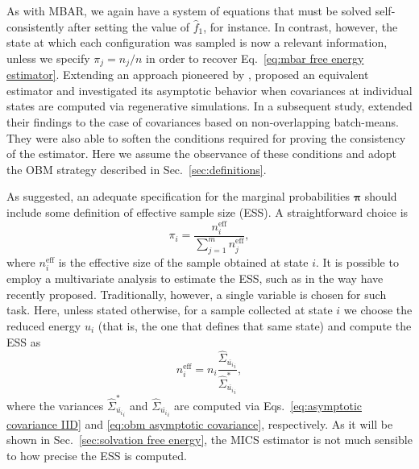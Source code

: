 \documentclass[journal=jctcce,manuscript=article,layout=twocolumn]{achemso}
\newcommand{\mt}[1]{\boldsymbol{\mathbf{#1}}}   %
\newcommand{\vt}[1]{\boldsymbol{\mathbf{#1}}}   %
\newcommand{\avg}[1]{\overline{#1}}             %
\begin{document}
As with MBAR, we again have a system of equations that must be solved self-consistently after setting the value of $\hat f_1$, for instance. In contrast, however, the state at which each configuration was sampled is now a relevant information, unless we specify $\pi_j = {n_j}/{n}$ in order to recover Eq.~\eqref{eq:mbar free energy estimator}. Extending an approach pioneered by \citeauthor{Geyer_1994} \cite{Geyer_1994}, \citeauthor{Doss_2014} \cite{Doss_2014} proposed an equivalent estimator and investigated its asymptotic behavior when covariances at individual states are computed via regenerative simulations. In a subsequent study, \citeauthor{Roy_2018} \cite{Roy_2018} extended their findings to the case of covariances based on non-overlapping batch-means. They were also able to soften the conditions required for proving the consistency of the estimator. Here we assume the observance of these conditions and adopt the OBM strategy described in Sec.~\ref{sec:definitions}. 

As \citeauthor{Roy_2018} \cite{Roy_2018} suggested, an adequate specification for the marginal probabilities $\vt \pi$ should include some definition of effective sample size (ESS). A straightforward choice is
\begin{equation}
\label{eq:mblock prior}
\pi_i = \frac{n^\text{eff}_i}{\sum_{j=1}^m n^\text{eff}_j},
\end{equation}
where $n^\text{eff}_i$ is the effective size of the sample obtained at state $i$. It is possible to employ a multivariate analysis to estimate the ESS, such as in the way \citeauthor{Vats_2015} \cite{Vats_2015, Vats_2018} have recently proposed. Traditionally, however, a single variable is chosen for such task. Here, unless stated otherwise, for a sample collected at state $i$ we choose the reduced energy $u_i$ (that is, the one that defines that same state) and compute the ESS as
\begin{equation*}
n^\text{eff}_i = n_i \frac{\hat{\Sigma}_{\avg{u_i}_i}}{\hat{\Sigma}^\ast_{\avg{u_i}_i}},
\end{equation*}
where the variances $\hat{\Sigma}_{\avg{u_i}_i}^\ast$ and $\hat{\Sigma}_{\avg{u_i}_i}$ are computed via Eqs.~\eqref{eq:asymptotic covariance IID} and \eqref{eq:obm asymptotic covariance}, respectively. As it will be shown in Sec.~\ref{sec:solvation free energy}, the MICS estimator is not much sensible to how precise the ESS is computed.
\end{document}
